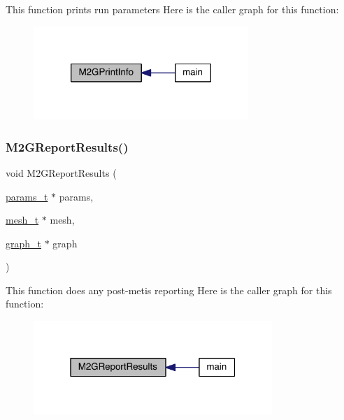 This function prints run parameters Here is the caller graph for this function\+:\nopagebreak
\begin{figure}[H]
\begin{center}
\leavevmode
\includegraphics[width=230pt]{a00948_ac1de26132f220c8648448493e1c701c3_icgraph}
\end{center}
\end{figure}
\mbox{\label{a00948_a1830d2cc04f766d0cf9f16cbf81d0a4b}} 
\subsubsection{\texorpdfstring{M2\+G\+Report\+Results()}{M2GReportResults()}}
{\footnotesize\ttfamily void M2\+G\+Report\+Results (\begin{DoxyParamCaption}\item[{\hyperlink{a00706}{params\+\_\+t} $\ast$}]{params,  }\item[{\hyperlink{a00738}{mesh\+\_\+t} $\ast$}]{mesh,  }\item[{\hyperlink{a00734}{graph\+\_\+t} $\ast$}]{graph }\end{DoxyParamCaption})}

This function does any post-\/metis reporting Here is the caller graph for this function\+:\nopagebreak
\begin{figure}[H]
\begin{center}
\leavevmode
\includegraphics[width=256pt]{a00948_a1830d2cc04f766d0cf9f16cbf81d0a4b_icgraph}
\end{center}
\end{figure}
\mbox{\label{a00948_a921bb5a29825f90d7095365cc3e92bdc}} 
